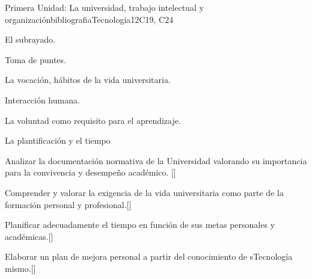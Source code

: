 \begin{syllabus}
\begin{unit}{}{Primera Unidad: La universidad, trabajo intelectual y organización}{bibliografiaTecnologia}{12}{C19, C24}
\begin{topics}
        \item El subrayado.
        \item Toma de puntes.
        \item La vocación, hábitos de la vida universitaria.
        \item Interacción humana.
        \item La voluntad como requisito para el aprendizaje.
        \item La plantificación y el tiempo
\end{topics}
\begin{learningoutcomes}
        \item Analizar la documentación normativa de la Universidad valorando su importancia para la  convivencia y desempeño académico. [\Usage]
        \item Comprender y valorar la exigencia de la vida universitaria como parte de la formación personal y profesional.[\Usage]
        \item Planificar adecuadamente el tiempo  en función de sus metas personales y académicas.[\Usage]
        \item Elaborar un plan de mejora personal a partir del conocimiento de sTecnología mismo.[\Usage]
\end{learningoutcomes}
\end{unit}


\end{syllabus}

